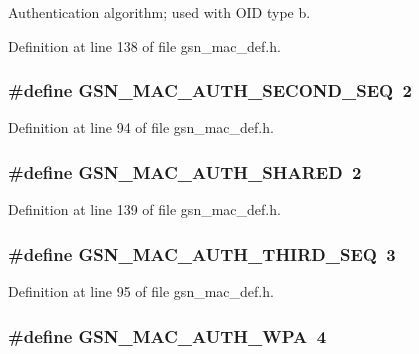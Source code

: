 Authentication algorithm; used with OID type b. 



Definition at line 138 of file gsn\_\-mac\_\-def.h.

\hypertarget{a00642_ga57052f7661d88b214bdd95c8813cf7ab}{
\subsubsection[{GSN\_\-MAC\_\-AUTH\_\-SECOND\_\-SEQ}]{\setlength{\rightskip}{0pt plus 5cm}\#define GSN\_\-MAC\_\-AUTH\_\-SECOND\_\-SEQ~2}}
\label{a00642_ga57052f7661d88b214bdd95c8813cf7ab}


Definition at line 94 of file gsn\_\-mac\_\-def.h.

\hypertarget{a00642_gaf44feac70f9ce6dc783578b7ccc2f8a3}{
\subsubsection[{GSN\_\-MAC\_\-AUTH\_\-SHARED}]{\setlength{\rightskip}{0pt plus 5cm}\#define GSN\_\-MAC\_\-AUTH\_\-SHARED~2}}
\label{a00642_gaf44feac70f9ce6dc783578b7ccc2f8a3}


Definition at line 139 of file gsn\_\-mac\_\-def.h.

\hypertarget{a00642_ga9dacfef47d27c883bff514e485ef2e56}{
\subsubsection[{GSN\_\-MAC\_\-AUTH\_\-THIRD\_\-SEQ}]{\setlength{\rightskip}{0pt plus 5cm}\#define GSN\_\-MAC\_\-AUTH\_\-THIRD\_\-SEQ~3}}
\label{a00642_ga9dacfef47d27c883bff514e485ef2e56}


Definition at line 95 of file gsn\_\-mac\_\-def.h.

\hypertarget{a00642_ga0a443ae2a1e4873621cdbb480dc8a7fc}{
\subsubsection[{GSN\_\-MAC\_\-AUTH\_\-WPA}]{\setlength{\rightskip}{0pt plus 5cm}\#define GSN\_\-MAC\_\-AUTH\_\-WPA~4}}
\label{a00642_ga0a443ae2a1e4873621cdbb480dc8a7fc}


